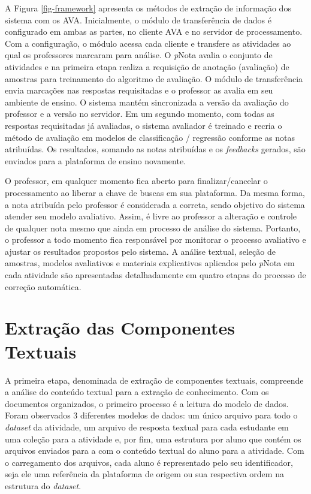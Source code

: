 A Figura \ref{fig-framework} apresenta os métodos de extração de informação dos sistema com os AVA. Inicialmente, o módulo de transferência de dados é configurado em ambas as partes, no cliente AVA e no servidor de processamento. Com a configuração, o módulo acessa cada cliente e transfere as atividades ao qual os professores marcaram para análise. O \textit{p}Nota avalia o conjunto de atividades e na primeira etapa realiza a requisição de anotação (avaliação) de amostras para treinamento do algoritmo de avaliação. O módulo de transferência envia marcações nas respostas requisitadas e o professor as avalia em seu ambiente de ensino. O sistema mantém sincronizada a versão da avaliação do professor e a versão no servidor. Em um segundo momento, com todas as respostas requisitadas já avaliadas, o sistema avaliador é treinado e recria o método de avaliação em modelos de classificação / regressão conforme as notas atribuídas. Os resultados, somando as notas atribuídas e os \textit{feedbacks} gerados, são enviados para a plataforma de ensino novamente.

O professor, em qualquer momento fica aberto para finalizar/cancelar o processamento ao liberar a chave de buscas em sua plataforma. Da mesma forma, a nota atribuída pelo professor é considerada a correta, sendo objetivo do sistema atender seu modelo avaliativo. Assim, é livre ao professor a alteração e controle de qualquer nota mesmo que ainda em processo de análise do sistema. Portanto, o professor a todo momento fica responsável por monitorar o processo avaliativo e ajustar os resultados propostos pelo sistema. A análise textual, seleção de amostras, modelos avaliativos e materiais explicativos aplicados pelo \textit{p}Nota em cada atividade são apresentadas detalhadamente em quatro etapas do processo de correção automática.

\section{Extração das Componentes Textuais}
\label{sec-componentes-textuais}

A primeira etapa, denominada de extração de componentes textuais, compreende a análise do conteúdo textual para a extração de conhecimento. Com os documentos organizados, o primeiro processo é a leitura do modelo de dados. Foram observados 3 diferentes modelos de dados: um único arquivo para todo o \textit{dataset} da atividade, um arquivo de resposta textual para cada estudante em uma coleção para a atividade e, por fim, uma estrutura por aluno que contém os arquivos enviados para a com o conteúdo textual do aluno para a atividade. Com o carregamento dos arquivos, cada aluno é representado pelo seu identificador, seja ele uma referência da plataforma de origem ou sua respectiva ordem na estrutura do \textit{dataset}.

